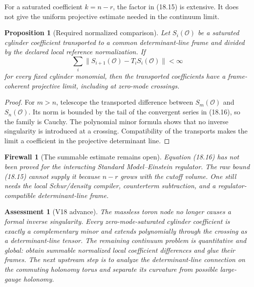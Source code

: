 \documentclass[11pt]{article}
\newtheorem{proposition}[theorem]{Proposition}
\newtheorem{assessment}[theorem]{Assessment}
\newtheorem{firewall}[theorem]{Firewall}
\begin{document}
For a saturated coefficient \(k=n-r\), the factor in (18.15) is
extensive.  It does not give the uniform projective estimate needed in
the continuum limit.

\begin{proposition}[Required normalized comparison]
\label{prop:v11v18-normalized-comparison}
Let \(S_i(\mathcal O)\) be a saturated cylinder coefficient transported
to a common determinant-line frame and divided by the declared local
reference normalization.  If
\[
 \sum_i
 \|S_{i+1}(\mathcal O)-T_iS_i(\mathcal O)\|<\infty
 \tag{18.16}
\]
for every fixed cylinder monomial, then the transported coefficients have
a frame-coherent projective limit, including at zero-mode crossings.
\end{proposition}

\begin{proof}
For \(m>n\), telescope the transported difference between
\(S_m(\mathcal O)\) and \(S_n(\mathcal O)\).  Its norm is bounded by the
tail of the convergent series in (18.16), so the family is Cauchy.
The polynomial minor formula shows that no inverse singularity is
introduced at a crossing.  Compatibility of the transports makes the
limit a coefficient in the projective determinant line.
\end{proof}

\begin{firewall}[The summable estimate remains open]
\label{fw:v11v18-summable}
Equation (18.16) has not been proved for the interacting
Standard Model--Einstein regulator.  The raw bound (18.15) cannot supply
it because \(n-r\) grows with the cutoff volume.  One still needs the
local Schur/density compiler, counterterm subtraction, and a
regulator-compatible determinant-line frame.
\end{firewall}

\begin{assessment}[V18 advance]
\label{ass:v11v18}
The massless toron node no longer causes a formal inverse singularity.
Every zero-mode-saturated cylinder coefficient is exactly a complementary
minor and extends polynomially through the crossing as a determinant-line
tensor.  The remaining continuum problem is quantitative and global:
obtain summable normalized local coefficient differences and glue their
frames.  The next upstream step is to analyze the determinant-line
connection on the commuting holonomy torus and separate its curvature
from possible large-gauge holonomy.
\end{assessment}
\end{document}
